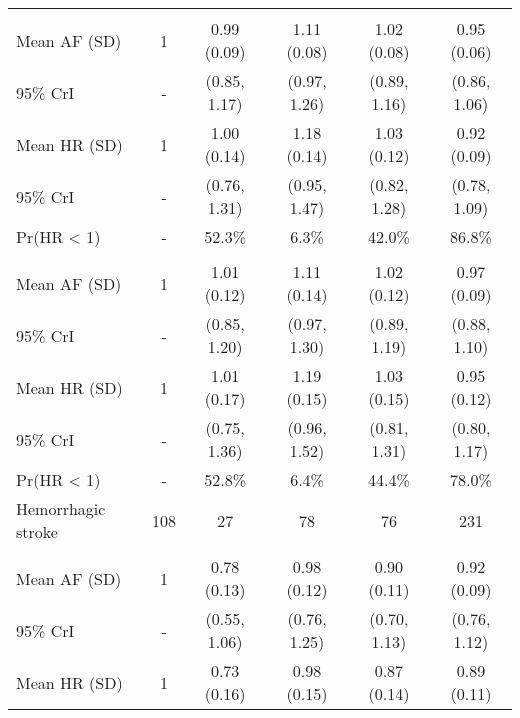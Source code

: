 \documentclass[nutrients,article,submitted,moreauthors,pdftex]{Definitions/mdpi}
\begin{document}
\begin{table}[H]
{\begin{tabular}[t]{lccccc}
\addlinespace[0.3em]
\multicolumn{6}{l}{\textbf{Model 1}}\\
\rowcolor{gray!6}  \hspace{1em}Mean AF (SD) & 1 & 0.99 (0.09) & 1.11 (0.08) & 1.02 (0.08) & 0.95 (0.06)\\
\hspace{1em}95\% CrI & - & (0.85, 1.17) & (0.97, 1.26) & (0.89, 1.16) & (0.86, 1.06)\\
\rowcolor{gray!6}  \hspace{1em}Mean HR (SD) & 1 & 1.00 (0.14) & 1.18 (0.14) & 1.03 (0.12) & 0.92 (0.09)\\
\hspace{1em}95\% CrI & - & (0.76, 1.31) & (0.95, 1.47) & (0.82, 1.28) & (0.78, 1.09)\\
\rowcolor{gray!6}  \hspace{1em}Pr(HR < 1) & - & 52.3\% & 6.3\% & 42.0\% & 86.8\%\\
\addlinespace[0.3em]
\multicolumn{6}{l}{\textbf{Model 2}}\\
\hspace{1em}Mean AF (SD) & 1 & 1.01 (0.12) & 1.11 (0.14) & 1.02 (0.12) & 0.97 (0.09)\\
\rowcolor{gray!6}  \hspace{1em}95\% CrI & - & (0.85, 1.20) & (0.97, 1.30) & (0.89, 1.19) & (0.88, 1.10)\\
\hspace{1em}Mean HR (SD) & 1 & 1.01 (0.17) & 1.19 (0.15) & 1.03 (0.15) & 0.95 (0.12)\\
\rowcolor{gray!6}  \hspace{1em}95\% CrI & - & (0.75, 1.36) & (0.96, 1.52) & (0.81, 1.31) & (0.80, 1.17)\\
\hspace{1em}Pr(HR < 1) & - & 52.8\% & 6.4\% & 44.4\% & 78.0\%\\
\hline
\rowcolor{gray!6}  Hemorrhagic stroke & 108 & 27 & 78 & 76 & 231\\
\addlinespace[0.3em]
\multicolumn{6}{l}{\textbf{Model 0}}\\
\hspace{1em}Mean AF (SD) & 1 & 0.78 (0.13) & 0.98 (0.12) & 0.90 (0.11) & 0.92 (0.09)\\
\rowcolor{gray!6}  \hspace{1em}95\% CrI & - & (0.55, 1.06) & (0.76, 1.25) & (0.70, 1.13) & (0.76, 1.12)\\
\hspace{1em}Mean HR (SD) & 1 & 0.73 (0.16) & 0.98 (0.15) & 0.87 (0.14) & 0.89 (0.11)\\

\end{tabular}}
\end{table}
\end{document}
